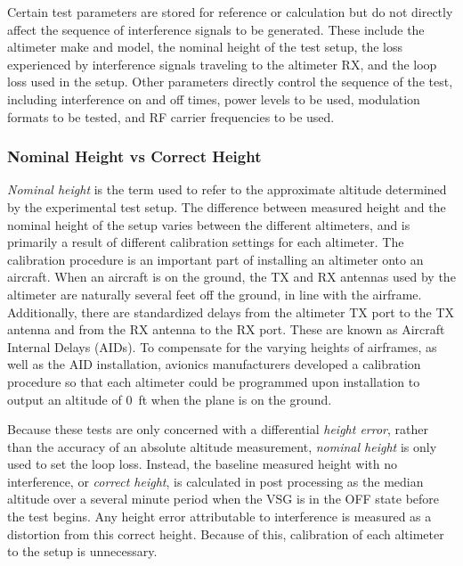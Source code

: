Certain test parameters are stored for reference or calculation but do not directly affect the sequence of interference signals to be generated. These include the altimeter make and model, the nominal height of the test setup, the loss experienced by interference signals traveling to the altimeter RX, and the loop loss used in the setup. Other parameters directly control the sequence of the test, including interference on and off times, power levels to be used, modulation formats to be tested, and RF carrier frequencies to be used. 

\subsubsection{Nominal Height vs Correct Height}\label{subsub:nominal}
\textit{Nominal height} is the term used to refer to the approximate altitude determined by the experimental test setup. The difference between measured height and the nominal height of the setup varies between the different altimeters, and is primarily a result of different calibration settings for each altimeter. The calibration procedure is an important part of installing an altimeter onto an aircraft. When an aircraft is on the ground, the TX and RX antennas used by the altimeter are naturally several feet off the ground, in line with the airframe. Additionally, there are standardized delays from the altimeter TX port to the TX antenna and from the RX antenna to the RX port. These are known as Aircraft Internal Delays (AIDs). To compensate for the varying heights of airframes, as well as the AID installation, avionics manufacturers developed a calibration procedure so that each altimeter could be programmed upon installation to output an altitude of 0~ft when the plane is on the ground. 

Because these tests are only concerned with a differential \textit{height error}, rather than the accuracy of an absolute altitude measurement, \textit{nominal height} is only used to set the loop loss. Instead, the baseline measured height with no interference, or \textit{correct height}, is calculated in post processing as the median altitude over a several minute period when the VSG is in the OFF state before the test begins. Any height error attributable to interference is measured as a distortion from this correct height. Because of this, calibration of each altimeter to the setup is unnecessary. 

